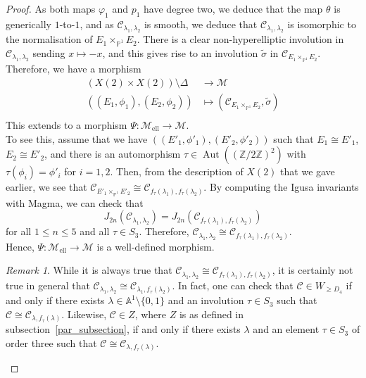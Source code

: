 \documentclass{amsart}
\newcommand{\calC}{\mathcal{C}}
\newcommand{\calM}{\mathcal{M}}
\DeclareMathOperator{\Aut}{Aut}
\newcommand{\nor}{\calC_{E_1 \times_{\mathbb{P}^1} E_2}}
\newcommand{\mell}{\mathcal{M}_{\text{ell}}}
\numberwithin{equation}{section}
\theoremstyle{definition}
\theoremstyle{remark}
\newtheorem{remark}[theorem]{Remark}
\begin{document}
\begin{proof}
As both maps $\varphi_1$ and $p_1$ have degree two, we deduce that the map $\theta$ is generically $1$-to-$1$, and as $\calC_{\lambda_1,\lambda_2}$ is smooth, we deduce that $\calC_{\lambda_1,\lambda_2}$ is isomorphic to the normalisation of $E_1\times_{\mathbb{P}^1}E_2$. There is a clear non-hyperelliptic involution
in $\calC_{\lambda_1,\lambda_2}$ sending $x\mapsto -x$, and this gives rise to an involution $\tilde{\sigma}$ in $\nor$.
Therefore, we have a morphism
\begin{align*}
(X(2)\times X(2))\setminus\Delta&\longrightarrow\calM\\
((E_1,\phi_1),(E_2,\phi_2))&\longmapsto(\nor,\tilde{\sigma})\\
\end{align*}
This extends to a morphism $\Psi:\mell\rightarrow\calM$.\\

To see this, assume that we have $((E'_1, \phi'_1), (E'_2, \phi'_2))$ such that $E_1 \cong E'_1$, $E_2 \cong E'_2$, and there is an automorphism $\tau \in \Aut((\mathbb{Z}/2\mathbb{Z})^2)$ with $\tau(\phi_i) = \phi'_i$ for $i = 1, 2$.  
Then, from the description of $X(2)$ that we gave earlier, we see that $\mathcal{C}_{E'_1 \times_{\mathbb{P}^1} E'_2} \cong \mathcal{C}_{f_\tau(\lambda_1), f_\tau(\lambda_2)}$.  
By computing the Igusa invariants with Magma, we can check that 
\[
J_{2n}(\mathcal{C}_{\lambda_1, \lambda_2}) = J_{2n}(\mathcal{C}_{f_\tau(\lambda_1), f_\tau(\lambda_2)})
\]
for all $1 \leq n \leq 5$ and all $\tau \in S_3$. Therefore, $\mathcal{C}_{\lambda_1, \lambda_2} \cong \mathcal{C}_{f_\tau(\lambda_1), f_\tau(\lambda_2)}$.\\

Hence, $\Psi: \mathcal{M}_{\mathrm{ell}} \to \mathcal{M}$ is a well-defined morphism.

\begin{remark}
While it is always true that $\mathcal{C}_{\lambda_1, \lambda_2} \cong \mathcal{C}_{f_\tau(\lambda_1), f_\tau(\lambda_2)}$, it is certainly not true in general that $\mathcal{C}_{\lambda_1, \lambda_2} \cong \mathcal{C}_{\lambda_1, f_\tau(\lambda_2)}$.  
In fact, one can check that $\mathcal{C} \in W_{\geq D_4}$ if and only if there exists $\lambda \in \mathbb{A}^1 \setminus \{0,1\}$ and an involution $\tau \in S_3$ such that $\mathcal{C} \cong \mathcal{C}_{\lambda, f_\tau(\lambda)}$.  
Likewise, $\mathcal{C} \in Z$, where $Z$ is as defined in subsection~\ref{par_subsection}, if and only if there exists $\lambda$ and an element $\tau \in S_3$ of order three such that $\mathcal{C} \cong \mathcal{C}_{\lambda, f_\tau(\lambda)}$.\\
\end{remark}
\newpage


\end{proof}
\end{document}

